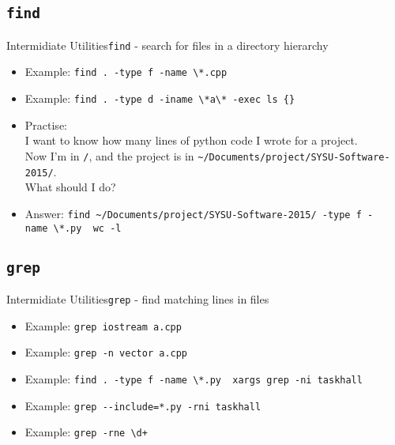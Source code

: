 \documentclass[aspectratio=169]{beamer}
\begin{document}
\subsection{\tt find}
\begin{frame}{Intermidiate Utilities}{\texttt{find} - search for files in a directory hierarchy}

\begin{itemize}[<+->]
\item
  Example: \texttt{find\ .\ -type\ f\ -name\ \textbackslash{}*.cpp}
\item
  Example:
  \texttt{find\ .\ -type\ d\ -iname\ \textbackslash{}*a\textbackslash{}*\ -exec\ ls\ \{\}}
\item
  Practise:\\
  I want to know how many lines of python code I wrote for a project.\\
  Now I'm in \texttt{/}, and the project is in
  \texttt{\textasciitilde{}/Documents/project/SYSU-Software-2015/}.\\
  What should I do?
\item
  Answer:
  \texttt{find\ \textasciitilde{}/Documents/project/SYSU-Software-2015/\ -type\ f\ -name\ \textbackslash{}*.py\ \textbar{}\ wc\ -l}
\end{itemize}

\end{frame}

\subsection{\tt grep}
\begin{frame}{Intermidiate Utilities}{\texttt{grep} - find matching lines in files}

\begin{itemize}[<+->]
\item
  Example: \texttt{grep\ iostream\ a.cpp}
\item
  Example: \texttt{grep\ -n\ vector\ a.cpp}
\item
  Example:
  \texttt{find\ .\ -type\ f\ -name\ \textbackslash{}*.py\ \textbar{}\ xargs\ grep\ -ni\ taskhall}
\item
  Example: \texttt{grep\ -\/-include=*.py\ -rni\ taskhall}
\item
  Example:
  \texttt{grep\ -rne\ \textquotesingle{}\textbackslash{}d+\textquotesingle{}}
\end{itemize}

\end{frame}
\end{document}
